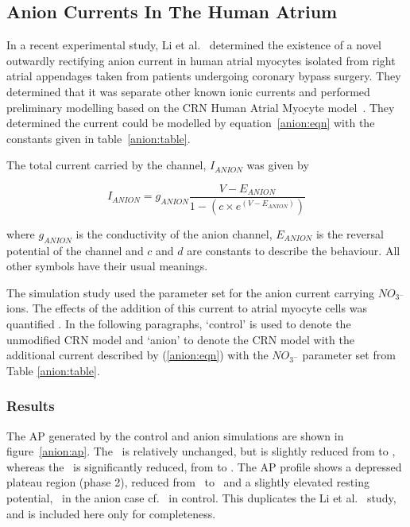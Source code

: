 \subsection{Anion Currents In The Human Atrium}

In a recent experimental study, Li et al.~\cite{li2007} determined the existence
of a novel outwardly rectifying anion current in human atrial myocytes isolated
from right atrial appendages taken from patients undergoing coronary bypass
surgery.  They determined that it was separate other known ionic currents and
performed preliminary modelling based on the CRN Human Atrial Myocyte
model~\cite{crn98}.  They determined the current could be modelled by
equation~\ref{anion:eqn} with the constants given in table~\ref{anion:table}.

The total current carried by the channel, $I_{ANION}$ was given by

\begin{equation}
\label{anion:eqn}
I_{ANION} = g_{ANION} \frac{V-E_{ANION}}{1-\left(c\times e^{\left(V-E_{ANION}\right)}\right)}
\end{equation}

where $g_{ANION}$ is the conductivity of the anion channel, $E_{ANION}$ is
the reversal potential of the channel and $c$ and $d$ are constants to
describe the behaviour.  All other symbols have their usual meanings.

The simulation study used the parameter set for the anion current carrying
$NO_{3^{-}}$ ions.  The effects of the addition of this current to atrial
myocyte cells was quantified .  In the following
paragraphs, `control' is used to denote the unmodified CRN model and `anion' to
denote the CRN model with the additional current described by (\ref{anion:eqn})
with the $NO_{3^{-}}$ parameter set from Table \ref{anion:table}.

\subsubsection{Results}

The AP generated by the control and anion simulations are shown in
figure~\ref{anion:ap}.  The \apd\ is relatively unchanged, but is slightly
reduced from  to , whereas the \apd[50]\ is significantly
reduced, from  to .  The AP profile shows a depressed plateau region (phase
2), reduced from \ to \ and a slightly elevated resting potential,
\ in the anion case cf. \ in control.  This duplicates the Li et
al.~\cite{li2007} study, and is included here only for completeness.

